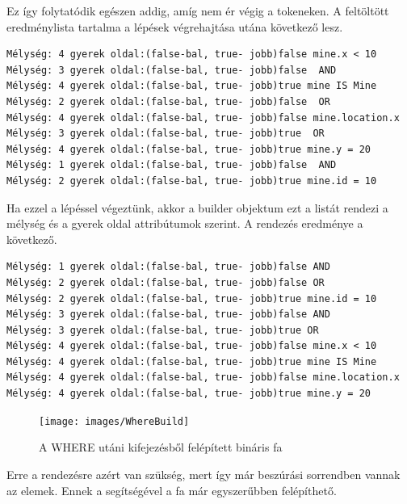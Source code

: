Ez így folytatódik egészen addig, amíg nem ér végig a tokeneken. A feltöltött eredménylista tartalma a lépések végrehajtása utána következő lesz.

\begin{verbatim}
Mélység: 4 gyerek oldal:(false-bal, true- jobb)false mine.x < 10
Mélység: 3 gyerek oldal:(false-bal, true- jobb)false  AND
Mélység: 4 gyerek oldal:(false-bal, true- jobb)true mine IS Mine 
Mélység: 2 gyerek oldal:(false-bal, true- jobb)false  OR
Mélység: 4 gyerek oldal:(false-bal, true- jobb)false mine.location.x 
Mélység: 3 gyerek oldal:(false-bal, true- jobb)true  OR
Mélység: 4 gyerek oldal:(false-bal, true- jobb)true mine.y = 20 
Mélység: 1 gyerek oldal:(false-bal, true- jobb)false  AND
Mélység: 2 gyerek oldal:(false-bal, true- jobb)true mine.id = 10 
\end{verbatim}

Ha ezzel a lépéssel végeztünk, akkor a builder objektum ezt a listát rendezi a mélység és a gyerek oldal attribútumok szerint. A rendezés eredménye a következő.

\begin{verbatim}
Mélység: 1 gyerek oldal:(false-bal, true- jobb)false AND
Mélység: 2 gyerek oldal:(false-bal, true- jobb)false OR
Mélység: 2 gyerek oldal:(false-bal, true- jobb)true mine.id = 10
Mélység: 3 gyerek oldal:(false-bal, true- jobb)false AND
Mélység: 3 gyerek oldal:(false-bal, true- jobb)true OR
Mélység: 4 gyerek oldal:(false-bal, true- jobb)false mine.x < 10
Mélység: 4 gyerek oldal:(false-bal, true- jobb)true mine IS Mine
Mélység: 4 gyerek oldal:(false-bal, true- jobb)false mine.location.x
Mélység: 4 gyerek oldal:(false-bal, true- jobb)true mine.y = 20
\end{verbatim}

\begin{figure}[htb]
	\begin{center}
		\texttt{[image: images/WhereBuild]}
		\caption{A WHERE utáni kifejezésből felépített bináris fa}
		\label{fig:wherePostorderBuilder}
	\end{center}
\end{figure}

Erre a rendezésre azért van szükség, mert így már beszúrási sorrendben vannak az elemek. Ennek a segítségével a fa már egyszerűbben felépíthető.

